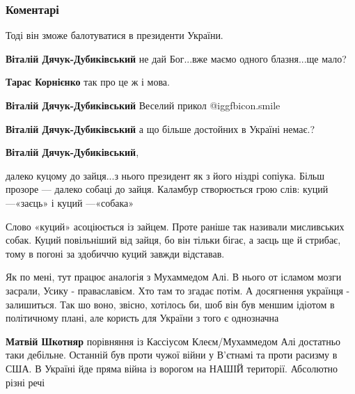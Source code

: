  
 
 
 
 
\subsubsection{Коментарі}
\label{sec:26_09_2021.fb.skachko_stas.1.usik_istina.cmt}

\begin{itemize} %
Тоді він зможе балотуватися в президенти України.

\begin{itemize} %
\textbf{Віталій Дячук-Дубиківський} не дай Бог...вже маємо одного блазня...ще мало?

\textbf{Тарас Корнієнко} так про це ж і мова.

\textbf{Віталій Дячук-Дубиківський} Веселий прикол  @igg{fbicon.smile} 

\textbf{Віталій Дячук-Дубиківський} а що більше достойних в Україні немає.?

\textbf{Віталій Дячук-Дубиківський}, 

далеко куцому до зайця...з нього президент як з його ніздрі сопіука. Більш
прозоре — далеко собаці до зайця. Каламбур створюється грою слів: куций
—«заєць» і куций —«собака»

Слово «куций» асоціюється із зайцем. Проте раніше так називали мисливських
собак. Куций повільніший від зайця, бо він тільки бігає, а заєць ще й стрибає,
тому в погоні за здобиччю куций завжди відставав.

\end{itemize} %


Як по мені, тут працює аналогія з Мухаммедом Алі.
В нього от ісламом мозги засрали, Усику - праваславієм.
Хто там то згадає потім. А досягнення українця - залишиться.
Так шо воно, звісно, хотілось би, шоб він був меншим ідіотом в політичному плані, але користь для України з того є однозначна

\begin{itemize} %
\textbf{Матвій Шкотняр} порівняння із Кассіусом Клеєм/Мухаммедом Алі достатньо таки дебільне. Останній був проти чужої війни у В'єтнамі та проти расизму в США. В Україні йде пряма війна із ворогом на НАШІЙ території. Абсолютно різні речі


\end{itemize}
\end{itemize}

